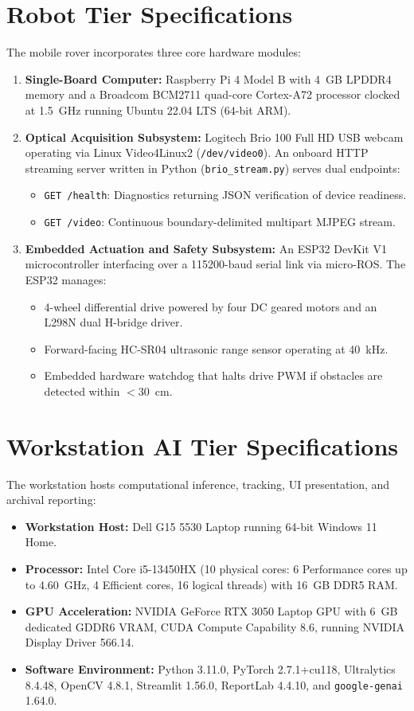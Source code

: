 \documentclass[12pt,a4paper,oneside]{report}
\begin{document}
\section{Robot Tier Specifications}
The mobile rover incorporates three core hardware modules:
\begin{enumerate}
  \item \textbf{Single-Board Computer:} Raspberry Pi 4 Model B with 4~GB LPDDR4 memory and a Broadcom BCM2711 quad-core Cortex-A72 processor clocked at 1.5~GHz running Ubuntu 22.04 LTS (64-bit ARM).
  \item \textbf{Optical Acquisition Subsystem:} Logitech Brio 100 Full HD USB webcam operating via Linux Video4Linux2 (\texttt{/dev/video0}). An onboard HTTP streaming server written in Python (\texttt{brio\_stream.py}) serves dual endpoints:
    \begin{itemize}
      \item \texttt{GET /health}: Diagnostics returning JSON verification of device readiness.
      \item \texttt{GET /video}: Continuous boundary-delimited multipart MJPEG stream.
    \end{itemize}
  \item \textbf{Embedded Actuation and Safety Subsystem:} An ESP32 DevKit V1 microcontroller interfacing over a 115200-baud serial link via micro-ROS. The ESP32 manages:
    \begin{itemize}
      \item 4-wheel differential drive powered by four DC geared motors and an L298N dual H-bridge driver.
      \item Forward-facing HC-SR04 ultrasonic range sensor operating at 40~kHz.
      \item Embedded hardware watchdog that halts drive PWM if obstacles are detected within $<30$~cm.
    \end{itemize}
\end{enumerate}

\section{Workstation AI Tier Specifications}
The workstation hosts computational inference, tracking, UI presentation, and archival reporting:
\begin{itemize}
  \item \textbf{Workstation Host:} Dell G15 5530 Laptop running 64-bit Windows 11 Home.
  \item \textbf{Processor:} Intel Core i5-13450HX (10 physical cores: 6 Performance cores up to 4.60~GHz, 4 Efficient cores, 16 logical threads) with 16~GB DDR5 RAM.
  \item \textbf{GPU Acceleration:} NVIDIA GeForce RTX 3050 Laptop GPU with 6~GB dedicated GDDR6 VRAM, CUDA Compute Capability 8.6, running NVIDIA Display Driver 566.14.
  \item \textbf{Software Environment:} Python 3.11.0, PyTorch 2.7.1+cu118, Ultralytics 8.4.48, OpenCV 4.8.1, Streamlit 1.56.0, ReportLab 4.4.10, and \texttt{google-genai} 1.64.0.
\end{itemize}
\end{document}
